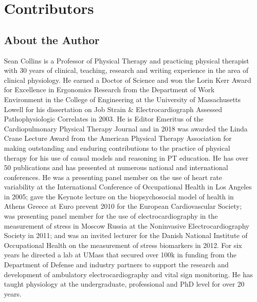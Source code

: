 
\thecontriblist

\section*{Contributors}

\subsection*{About the Author} 
Sean Collins is a Professor of Physical Therapy and practicing physical therapist with 30 years of clinical, teaching, research and writing experience in the area of clinical physiology. He earned a Doctor of Science and won the Lorin Kerr Award for Excellence in Ergonomics Research from the Department of Work Environment in the College of Engineering at the University of Massachusetts Lowell for his dissertation on Job Strain \& Electrocardiograph Assessed Pathophysiologic Correlates in 2003. He is Editor Emeritus of the Cardiopulmonary Physical Therapy Journal and in 2018 was awarded the Linda Crane Lecture Award from the American Physical Therapy Association for making outstanding and enduring contributions to the practice of physical therapy for his use of causal models and reasoning in PT education. He has over 50 publications and has presented at numerous national and international conferences. He was a presenting panel member on the use of heart rate variability at the International Conference of Occupational Health in Los Angeles in 2005; gave the Keynote lecture on the biopsychosocial model of health in Athens Greece at Euro prevent 2010 for the European Cardiovascular Society; was presenting panel member for the use of electrocardiography in the measurement of stress in Moscow Russia at the Noninvasive Electrocardiography Society in 2011; and was an invited lecturer for the Danish National Institute of Occupational Health on the measurement of stress biomarkers in 2012. For six years he directed a lab at UMass that secured over 100k in funding from the Department of Defense and industry partners to support the research and development of ambulatory electrocardiography and vital sign monitoring. He has taught physiology at the undergraduate, professional and PhD level for over 20 years.


